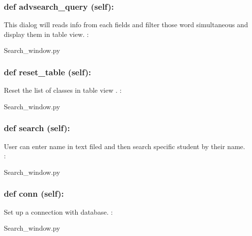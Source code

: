 \hypertarget{class_poly_a14a7ad77ce612b0c54f531d307ee4b39}{
\subsubsection[{def advsearch_query (self):}]{\setlength{\rightskip}{0pt plus 5cm}def {advsearch\_query} (self):}}\label{class_poly_a14a7ad77ce612b0c54f531d307ee4b39}
This dialog will reads info from each fields and filter those word simultaneous and display them in table view. 
:\begin{DoxyCompactItemize}
\item 
Search\_window.\-py\end{DoxyCompactItemize}

\hypertarget{class_poly_a14a7ad77ce612b0c54f531d307ee4b39}{
\subsubsection[{def reset_table (self):}]{\setlength{\rightskip}{0pt plus 5cm}def {reset\_table} (self):}}\label{class_poly_a14a7ad77ce612b0c54f531d307ee4b39}
Reset the list of classes in table view .
:\begin{DoxyCompactItemize}
\item 
Search\_window.\-py\end{DoxyCompactItemize}

\hypertarget{class_poly_a14a7ad77ce612b0c54f531d307ee4b39}{
\subsubsection[{def search (self):}]{\setlength{\rightskip}{0pt plus 5cm}def {search} (self):}}\label{class_poly_a14a7ad77ce612b0c54f531d307ee4b39}
User can enter name in text filed and then search specific student by their name.
:\begin{DoxyCompactItemize}
\item 
Search\_window.\-py\end{DoxyCompactItemize}

\hypertarget{class_poly_a14a7ad77ce612b0c54f531d307ee4b39}{
\subsubsection[{def conn (self):}]{\setlength{\rightskip}{0pt plus 5cm}def {conn} (self):}}\label{class_poly_a14a7ad77ce612b0c54f531d307ee4b39}
Set up a connection with database.
:\begin{DoxyCompactItemize}
\item 
Search\_window.\-py\end{DoxyCompactItemize}


